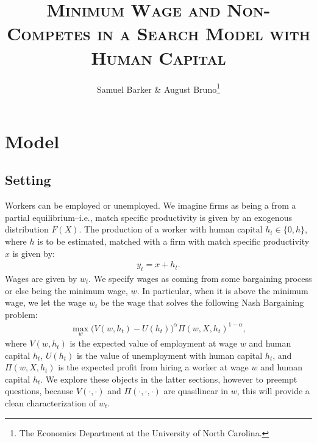 \documentclass[11pt]{article}
\title{\textsc{Minimum Wage and Non-Competes in a Search Model with Human Capital}}
\author{Samuel Barker \& August Bruno\footnote{The Economics
Department at the University of North Carolina.}}
\begin{document}
%
\maketitle
\begin{abstract}
\end{abstract}

\tableofcontents

\setcounter{page}{1}

\section[Model]{Model}%
\label{sec:model}

\subsection[Setting]{Setting}%
\label{sub:setting}

Workers can be employed or unemployed. We imagine firms as being a from a
partial equilibrium--i.e., match specific productivity is given by an
exogenous distribution $F(X)$. The production of a worker with human
capital $h_t \in  \{0,h\} $, where $h$ is to be estimated, matched with a
firm with match specific productivity $x$ is given by: 
\begin{align*}
    y_t = x + h_t
.\end{align*}
Wages are given by $w_t$. We specify wages as coming from some bargaining
process or else being the minimum wage, $\underline{w}$. In particular, when it is above the
minimum wage, we let the wage
$w_t$ be the wage that solves the following Nash Bargaining problem:
\begin{align*}
    \max_w \big ( V(w,h_t) - U(h_t) \big )^{\alpha} \Pi(w,X,h_t)^{1-\alpha}
,\end{align*}
where $V(w,h_t)$ is the expected value of employment at wage $w$ and
human capital $h_t$, $U(h_t)$ is the value of unemployment with human
capital  $h_t$, and $\Pi(w,X,h_t)$ is the expected profit from hiring a
worker at wage $w$ and human capital $h_t$. We explore these objects in the
latter sections, however to preempt questions, because $V(\cdot ,\cdot )$
and $\Pi(\cdot, \cdot ,\cdot)$ are quasilinear in $w$, this will provide a clean
characterization of $w_t$.
\end{document}
